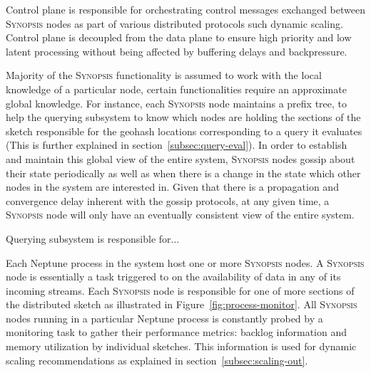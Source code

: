 \begin{description}[leftmargin=*]
	\item[Control plane:] Control plane is responsible for orchestrating control messages exchanged between \textsc{Synopsis} nodes as part of various distributed protocols such dynamic scaling.
	Control plane is decoupled from the data plane to ensure high priority and low latent processing without being affected by buffering delays and backpressure.

	\item[Gossip subsystem:] Majority of the \textsc{Synopsis} functionality is assumed to work with the local knowledge of a particular node, certain functionalities require an approximate global knowledge. 
	For instance, each \textsc{Synopsis} node maintains a prefix tree, to help the querying subsystem to know which nodes are holding the sections of the sketch responsible for the geohash locations corresponding to a query it evaluates (This is further explained in section~\ref{subsec:query-eval}). 
	In order to establish and maintain this global view of the entire system, \textsc{Synopsis} nodes gossip about their state periodically as well as when there is a change in the state which other nodes in the system are interested in.
	Given that there is a propagation and convergence delay inherent with the gossip protocols, at any given time, a \textsc{Synopsis} node will only have an eventually consistent view of the entire system.

	\item[Querying subsystem:] Querying subsystem is responsible for...
\end{description} 

Each Neptune process in the system host one or more \textsc{Synopsis} nodes.
A \textsc{Synopsis} node is essentially a task triggered to on the availability of data in any of its incoming streams.
Each \textsc{Synopsis} node is responsible for one of more sections of the distributed sketch as illustrated in Figure~\ref{fig:process-monitor}.
All \textsc{Synopsis} nodes running in a particular Neptune process is constantly probed by a monitoring task to gather their performance metrics: backlog information and memory utilization by individual sketches.
This information is used for dynamic scaling recommendations as explained in section~\ref{subsec:scaling-out}.

